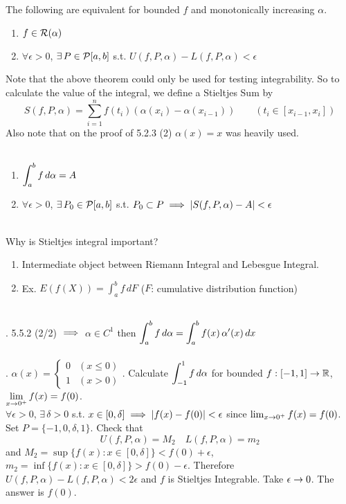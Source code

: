  The following are equivalent for bounded $f$ and monotonically increasing $\alpha$.
\begin{enumerate}
	\item $f\in \mathcal{R}(\alpha)$
	\item $\forall\epsilon>0$, $\exists\,P\in \mathcal{P}[a, b]$ s.t. $U(f, P, \alpha) - L(f, P, \alpha) < \epsilon$
\end{enumerate}
Note that the above theorem could only be used for testing integrability. So to calculate the value of the integral, we define a Stieltjes Sum by
$$S(f, P, \alpha) = \sum_{i=1}^n f(t_i) (\alpha(x_i) - \alpha(x_{i-1})) \qquad (t_i \in [x_{i-1}, x_i])$$
Also note that on the proof of 5.2.3 (2) $\alpha(x) = x$ was heavily used.\\
\\
\begin{enumerate}
	\item $\displaystyle\int_a^b f\,d\alpha = A$
	\item $\forall\epsilon > 0$, $\exists \,P_0\in\mathcal{P}[a, b]$ s.t. $P_0\subset P \implies \left|S(f, P, \alpha) - A \right| < \epsilon$
\end{enumerate}~\\
Why is Stieltjes integral important?
\begin{enumerate}
	\item Intermediate object between Riemann Integral and Lebesgue Integral.
	\item Ex. $E(f(X)) = \int_a^b f \, dF$ ($F$: cumulative distribution function)
\end{enumerate}~\\
\rmk. 5.5.2 (2/2) $\implies$ $\alpha \in C^1$ then $\displaystyle \int_a^b f\,d\alpha = \int_a^b f(x)\,\alpha'(x)\,dx$\\
\\
\ex. $\alpha(x) = \begin{cases}
	0 & (x\leq 0) \\ 1 & (x > 0)
\end{cases}$. Calculate $\displaystyle \int_{-1}^1 f\, d\alpha$ for bounded $f:[-1, 1]\rightarrow\mathbb{R}$, $\displaystyle \lim_{x\rightarrow0^{+}} f(x) = f(0)$.\\
$\forall \epsilon > 0$, $\exists\,\delta > 0$ s.t. $x\in [0, \delta] \implies \left|f(x)-f(0)\right| < \epsilon$ since $\lim_{x\rightarrow0^{+}} f(x) = f(0)$.\\
Set $P = \{-1, 0, \delta, 1\}$. Check that
$$U(f, P, \alpha) = M_2 \quad L(f, P, \alpha) = m_2$$
and $M_2 = \sup\{f(x): x\in [0, \delta]\} < f(0) + \epsilon$, $m_2 = \inf\{f(x):x\in [0, \delta]\} > f(0) - \epsilon$. Therefore $U(f, P, \alpha) - L(f, P, \alpha) < 2\epsilon$ and $f$ is Stieltjes Integrable. Take $\epsilon\rightarrow0$. The answer is $f(0)$.\\\\
